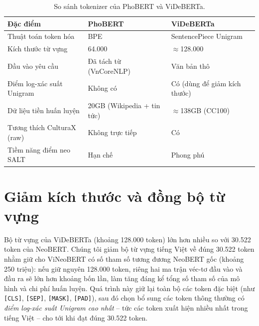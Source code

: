 \begin{table}[ht]
  \caption{So sánh tokenizer của PhoBERT và ViDeBERTa.}
  \label{tab:tokenizer-compare}
  \centering
  \small
  \begin{tabular}{lll}
    \hline
    \textbf{Đặc điểm}             & \textbf{PhoBERT}           & \textbf{ViDeBERTa} \\
    \hline
    Thuật toán token hóa            & BPE                        & SentencePiece Unigram \\
    Kích thước từ vựng            & 64.000                     & $\approx$128.000 \\
    Đầu vào yêu cầu               & Đã tách từ (VnCoreNLP)     & Văn bản thô \\
    Điểm log-xác suất Unigram     & Không có                   & Có (dùng để giảm kích thước) \\
    Dữ liệu tiền huấn luyện       & 20GB (Wikipedia + tin tức) & $\approx$138GB (CC100) \\
    Tương thích CulturaX (raw)    & Không trực tiếp            & Có \\
    Tiềm năng điểm neo SALT            & Hạn chế                    & Phong phú \\
    \hline
  \end{tabular}
\end{table}

\section{Giảm kích thước và đồng bộ từ vựng}
\label{sec:vocab}

Bộ từ vựng của ViDeBERTa (khoảng 128.000 token) lớn hơn nhiều so với 30.522 token của NeoBERT.
Chúng tôi giảm bộ từ vựng tiếng Việt về đúng 30.522 token nhằm giữ cho ViNeoBERT có số tham số tương đương NeoBERT gốc
(khoảng 250 triệu): nếu giữ nguyên 128.000 token, riêng hai ma trận véc-tơ đầu vào và đầu ra
sẽ lớn hơn khoảng bốn lần, làm tăng đáng kể tổng số tham số của mô hình và chi phí huấn luyện. Quá
trình này giữ lại toàn bộ các token
đặc biệt (như \texttt{[CLS]}, \texttt{[SEP]}, \texttt{[MASK]}, \texttt{[PAD]}), sau đó chọn
bổ sung các token thông thường có \textit{điểm log-xác suất Unigram cao nhất} -- tức các
token xuất hiện nhiều nhất trong tiếng Việt -- cho tới khi đạt đúng 30.522 token.

